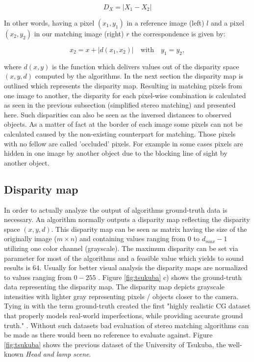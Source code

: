 \begin{equation}
  D_X = |X_1 - X_2|
\end{equation}

\noindent In other words, having a pixel $(x_1,y_1)$ in a reference image (left) $l$ and a pixel $(x_2,y_2)$ in our matching image (right) $r$ the correspondence is given by:

\begin{equation}
  x_2 = x + |d(x_1,x_2)|\quad \textrm{with}\quad y_1 = y_2,
\end{equation}

\noindent where $d(x,y)$ is the function which delivers values out of the disparity space $(x,y,d)$ computed by the algorithms.
In the next section the disparity map is outlined which represents the disparity map.
\newline\newline\noindent Resulting in matching pixels from one image to another, the disparity for each pixel-wise combination is calculated as seen in the previous subsection (simplified stereo matching) and presented here.
Such disparities can also be seen as the inversed distances to observed objects.
As a matter of fact at the border of each image some pixels can not be calculated caused by the non-existing counterpart for matching.
Those pixels with no fellow are called 'occluded' pixels.
For example in some cases pixels are hidden in one image by another object due to the blocking line of sight by another object.

\subsection*{Disparity map}

In order to actually analyze the output of algorithms ground-truth data is necessary.
An algorithm normally outputs a disparity map reflecting the disparity space $(x,y,d)$.
This disparity map can be seen as matrix having the size of the originally image ($m \times n$) and containing values ranging from $0$ to $d_{max} - 1$ utilizing one color channel (grayscale).
The maximum disparity can be set via parameter for most of the algorithms and a feasible value which yields to sound results is $64$.
Usually for better visual analysis the disparity maps are normalized to values ranging from $0 - 255$ \citep{martull2012realistic, cyganek2011introduction, scharstein2002taxonomy}.
Figure \ref{fig:tsukuba} c) shows the ground-truth data representing the disparity map.
The disparity map depicts grayscale intensities with lighter gray representing pixels / objects closer to the camera.
\newline\newline\noindent Tying in with the term ground-truth \citeauthor{martull2012realistic} created the first "highly realistic CG dataset that properly models real-world imperfections, while providing accurate ground truth." \citep{martull2012realistic}.
Without such datasets bad evaluation of stereo matching algorithms can be made as there would been no reference to evaluate against.
Figure \ref{fig:tsukuba} shows the previous dataset of the University of Tsukuba, the well-known \textit{Head and lamp scene}.

